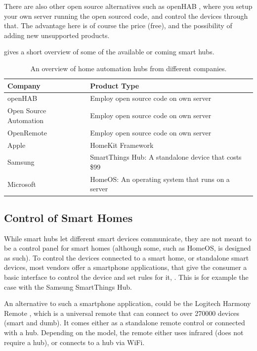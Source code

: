 There are also other open source alternatives such as openHAB \cite{OPENHAB}, 
where you setup your own server running the open sourced code, 
and control the devices through that. 
The advantage here is of course the price (free), 
and the possibility of adding new unsupported products. 

 gives a short overview of some of the available or coming smart hubs. 
\begin{table}
    \centering
    \begin{tabular}{l l}
        Company                           & Product Type \\ \hline
        openHAB \cite{OPENHAB}            & Employ open source code on own server \\
        Open Source Automation \cite{OSA} & Employ open source code on own server \\
        OpenRemote \cite{OPENREMOTE}      & Employ open source code on own server \\
        Apple \cite{HOMEKIT}              & HomeKit Framework \\
        Samsung \cite{SMARTTHINGS}        & SmartThings Hub: A standalone device that costs \$99 \\
        Microsoft \cite{HOMEOS}           & HomeOS: An operating system that runs on a server
    \end{tabular}
    \caption{An overview of home automation hubs from different companies.}
    \label{table:smarthubs}
\end{table}

\subsection{Control of Smart Homes}\label{sec:smarthomecontrol}
While smart hubs let different smart devices communicate, 
they are not meant to be a control panel for smart homes (although some, such as HomeOS, is designed as such).
To control the devices connected to a smart home, or standalone smart devices, 
most vendors offer a smartphone applications, 
that give the consumer a basic interface to control the device and set rules for it, \etc.
This is for example the case with the Samsung SmartThings Hub. 

An alternative to such a smartphone application, 
could be the Logitech Harmony Remote \cite{HARMONYREMOTE}, 
which is a universal remote that can connect to over \num{270000} devices (smart and dumb). 
It comes either as a standalone remote control or connected with a hub. 
Depending on the model, the remote either uses infrared (does not require a hub), 
or connects to a hub via WiFi. 


